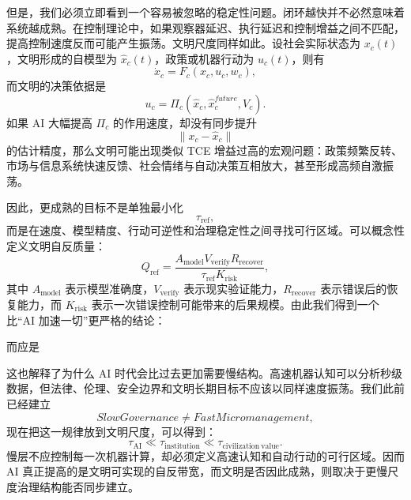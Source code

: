 但是，我们必须立即看到一个容易被忽略的稳定性问题。闭环越快并不必然意味着系统越成熟。在控制理论中，如果观察器延迟、执行延迟和控制增益之间不匹配，提高控制速度反而可能产生振荡。文明尺度同样如此。设社会实际状态为 $x_c(t)$，文明形成的自模型为 $\hat{x}_c(t)$，政策或机器行动为 $u_c(t)$，则有
\begin{equation}
\dot{x}_c
=
F_c(x_c,u_c,w_c),
\end{equation}
而文明的决策依据是
\begin{equation}
u_c
=
\Pi_c
\left(
\hat{x}_c,
\hat{x}^{future}_c,
V_c
\right).
\end{equation}
如果 AI 大幅提高 $\Pi_c$ 的作用速度，却没有同步提升
\begin{equation}
\left\|
x_c-\hat{x}_c
\right\|
\end{equation}
的估计精度，那么文明可能出现类似 TCE 增益过高的宏观问题：政策频繁反转、市场与信息系统快速反馈、社会情绪与自动决策互相放大，甚至形成高频自激振荡。

因此，更成熟的目标不是单独最小化
\begin{equation}
\tau_{\mathrm{ref}},
\end{equation}
而是在速度、模型精度、行动可逆性和治理稳定性之间寻找可行区域。可以概念性定义文明自反质量：
\begin{equation}
Q_{\mathrm{ref}}
=
\frac{
A_{\mathrm{model}}
V_{\mathrm{verify}}
R_{\mathrm{recover}}
}{
\tau_{\mathrm{ref}}
K_{\mathrm{risk}}
},
\end{equation}
其中 $A_{\mathrm{model}}$ 表示模型准确度，$V_{\mathrm{verify}}$ 表示现实验证能力，$R_{\mathrm{recover}}$ 表示错误后的恢复能力，而 $K_{\mathrm{risk}}$ 表示一次错误控制可能带来的后果规模。由此我们得到一个比“AI 加速一切”更严格的结论：
\begin{statementbox}
\centering
{}
\end{statementbox}
而应是
\begin{statementbox}
\centering
{}
\end{statementbox}

这也解释了为什么 AI 时代会比过去更加需要慢结构。高速机器认知可以分析秒级数据，但法律、伦理、安全边界和文明长期目标不应该以同样速度振荡。我们此前已经建立
\begin{equation}
SlowGovernance
\neq
FastMicromanagement,
\end{equation}
现在把这一规律放到文明尺度，可以得到：
\begin{equation}
\tau_{\mathrm{AI}}
\ll
\tau_{\mathrm{institution}}
\ll
\tau_{\mathrm{civilization\ value}}.
\end{equation}
慢层不应控制每一次机器计算，却必须定义高速认知和自动行动的可行区域。因而 AI 真正提高的是文明可实现的自反带宽，而文明是否因此成熟，则取决于更慢尺度治理结构能否同步建立。

